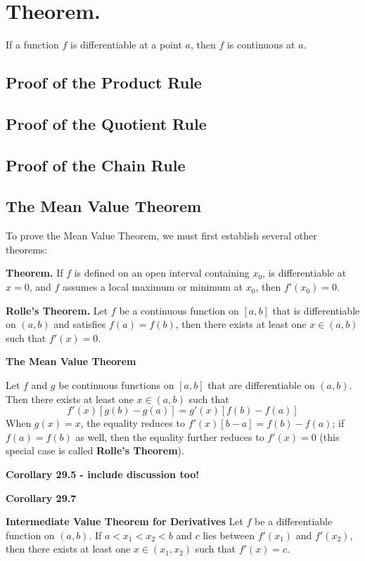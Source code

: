 \documentclass[12pt]{article}
\begin{document}
\section{Theorem.} If a function $f$ is differentiable at a point $a$, then $f$ is continuous at $a$.

\subsection{Proof of the Product Rule}

\subsection{Proof of the Quotient Rule}

\subsection{Proof of the Chain Rule}

\subsection{The Mean Value Theorem}

To prove the Mean Value Theorem, we must first establish several other theorems:

\textbf{Theorem.} If $f$ is defined on an open interval containing $x_0$, is differentiable at $x=0$, and $f$ assumes a local maximum or minimum at $x_0$, then $f'(x_0) = 0$.

\textbf{Rolle's Theorem.} Let $f$ be a continuous function on $[a,b]$ that is differentiable on $(a,b)$ and satisfies $f(a) = f(b)$, then there exists at least one $x \in (a,b)$ such that $f'(x) = 0$.

\textbf{The Mean Value Theorem}

Let $f$ and $g$ be continuous functions on $[a,b]$ that are differentiable on $(a,b)$. Then there exists at least one $x \in (a,b)$ such that $$f'(x)[g(b)-g(a)] = g'(x)[f(b)-f(a)]$$ When $g(x) = x$, the equality reduces to $f'(x)[b-a] = f(b)-f(a)$; if $f(a) = f(b)$ as well, then the equality further reduces to $f'(x) = 0$ (this special case is called \textbf{Rolle's Theorem}).

\textbf{Corollary 29.5 - include discussion too!}

\textbf{Corollary 29.7}

\textbf{Intermediate Value Theorem for Derivatives} Let $f$ be a differentiable function on $(a,b)$. If $a < x_1 < x_2 < b$ and $c$ lies between $f'(x_1)$ and $f'(x_2)$, then there exists at least one $x \in (x_1, x_2)$ such that $f'(x) = c$.
\end{document}

